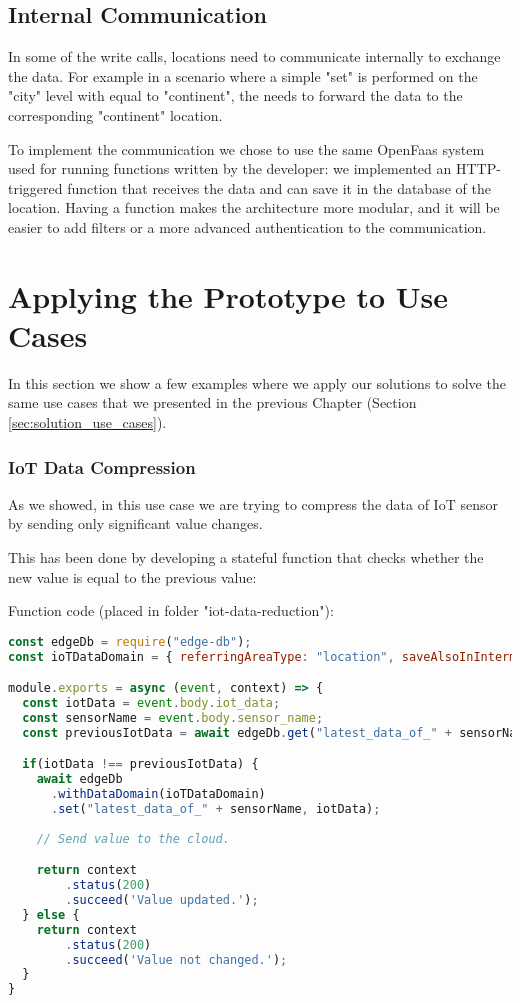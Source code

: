 \subsection{Internal Communication}
In some of the write calls, locations need to communicate internally to exchange the data. For example in a scenario where a simple "set" is performed on the "city" level with  equal to "continent", the  needs to forward the data to the corresponding "continent" location.

To implement the communication we chose to use the same OpenFaas system used for running functions written by the developer: we implemented an HTTP-triggered function that receives the data and can save it in the database of the location.
Having a function makes the architecture more modular, and it will be easier to add filters or a more advanced authentication to the communication.


\section{Applying the Prototype to Use Cases}
In this section we show a few examples where we apply our solutions to solve the same use cases that we presented in the previous Chapter (Section \ref{sec:solution_use_cases}).

\subsubsection{IoT Data Compression}
As we showed, in this use case we are trying to compress the data of IoT sensor by sending only significant value changes.

This has been done by developing a stateful function that checks whether the new value is equal to the previous value:

Function code (placed in folder "iot-data-reduction"):
\begin{lstlisting}[language=javascript]
const edgeDb = require("edge-db");
const ioTDataDomain = { referringAreaType: "location", saveAlsoInIntermediateLevels: false, ttl: 5*24*60*60*1000 }; // 5 days TTL.

module.exports = async (event, context) => {
  const iotData = event.body.iot_data;
  const sensorName = event.body.sensor_name;
  const previousIotData = await edgeDb.get("latest_data_of_" + sensorName);

  if(iotData !== previousIotData) {
    await edgeDb
      .withDataDomain(ioTDataDomain)
      .set("latest_data_of_" + sensorName, iotData);
        
    // Send value to the cloud.

    return context
        .status(200)
        .succeed('Value updated.');
  } else {
    return context
        .status(200)
        .succeed('Value not changed.');
  }
}
\end{lstlisting}

